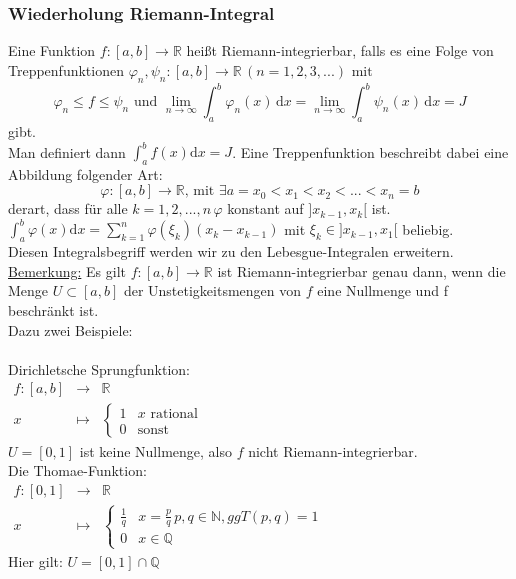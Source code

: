 \subsubsection{Wiederholung Riemann-Integral}
Eine Funktion $f \colon [a,b] \to \mathbb{R}$ heißt Riemann-integrierbar, falls es eine Folge von Treppenfunktionen $\varphi_n, \psi_n\colon [a,b] \to \mathbb{R} \, ( n = 1,2,3,...) \text{ mit }$\\ \[
\varphi_n \leq f \leq \psi_n \text{ und } \lim_{n \to \infty} \int_{a}^{b} \varphi_n(x) \,\text{d}x = \lim_{n \to \infty} \int_{a}^{b} \psi_n(x) \, \text{d}x = J\]
gibt.\\
Man definiert dann $\int_{a}^{b} f(x) \text{d}x = J$. Eine Treppenfunktion beschreibt dabei eine Abbildung folgender Art:
\[\varphi\colon [a,b] \to \mathbb{R} \text{, mit } \exists a = x_0<x_1<x_2<...<x_n=b \] derart, dass für alle $k=1,2,...,n \, \varphi$ konstant auf $]x_{k-1}, x_k[$ ist.\\
$\int_{a}^{b}\varphi(x) \text{d}x = \sum_{k=1}^{n} \varphi(\xi_k)(x_k - x_{k-1})$ mit $\xi_k \in ]x_{k-1}, x_1[$ beliebig.\\
Diesen Integralsbegriff werden wir zu den Lebesgue-Integralen erweitern.\\
\underline{Bemerkung:} Es gilt $f\colon [a,b] \to \mathbb{R}$ ist Riemann-integrierbar genau dann, wenn die Menge $U \subset [a,b]$ der Unstetigkeitsmengen von $f$ eine Nullmenge und f beschränkt ist.\\
Dazu zwei Beispiele:\\
\\
Dirichletsche Sprungfunktion:\\
$\begin{matrix}
		f\colon [a,b] & \to & \mathbb{R}\\
		x & \mapsto & \left \{
		\begin{matrix}
			1 & x \text{ rational}\\
			0 & \text{sonst}
		\end{matrix}
		\right .
\end{matrix}$\\
$U = [0,1]$ ist keine Nullmenge, also $f$ nicht Riemann-integrierbar.\\

Die Thomae-Funktion:\\
$\begin{matrix}
	f\colon [0,1] & \to & \mathbb{R}\\
	x & \mapsto & \left \{
	\begin{matrix}
		\frac{1}{q} & x = \frac{p}{q} \, p,q \in \mathbb{N}, ggT(p,q)=1\\
		0 & x \in \mathbb{Q}
	\end{matrix}
	\right .
\end{matrix}$\\
Hier gilt: $U = [0,1] \cap \mathbb{Q}$

